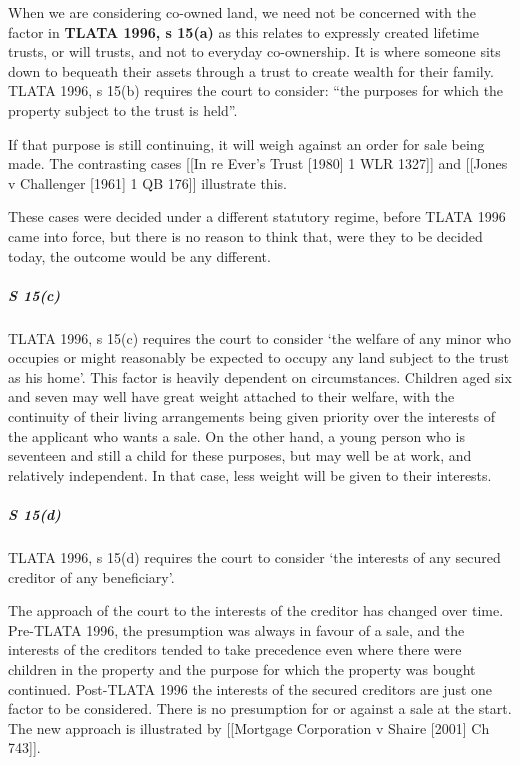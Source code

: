 \documentclass[
]{article}
\newenvironment{Shaded}{}{}
\newcommand{\NormalTok}[1]{#1}
\begin{document}
When we are considering co-owned land, we need not be concerned with the
factor in \textbf{TLATA 1996, s 15(a)} as this relates to expressly
created lifetime trusts, or will trusts, and not to everyday
co-ownership. It is where someone sits down to bequeath their assets
through a trust to create wealth for their family. TLATA 1996, s 15(b)
requires the court to consider: ``the purposes for which the property
subject to the trust is held''.

If that purpose is still continuing, it will weigh against an order for
sale being made. The contrasting cases {[}{[}In re Ever's Trust
{[}1980{]} 1 WLR 1327{]}{]} and {[}{[}Jones v Challenger {[}1961{]} 1 QB
176{]}{]} illustrate this.

\begin{Shaded}
\begin{Highlighting}[]
\NormalTok{These cases were decided under a different statutory regime, before TLATA 1996 came into force, but there is no reason to think that, were they to be decided today, the outcome would be any different.}
\end{Highlighting}
\end{Shaded}

\hypertarget{s-15c}{%
\subparagraph{S 15(c)}\label{s-15c}}

TLATA 1996, s 15(c) requires the court to consider `the welfare of any
minor who occupies or might reasonably be expected to occupy any land
subject to the trust as his home'. This factor is heavily dependent on
circumstances. Children aged six and seven may well have great weight
attached to their welfare, with the continuity of their living
arrangements being given priority over the interests of the applicant
who wants a sale. On the other hand, a young person who is seventeen and
still a child for these purposes, but may well be at work, and
relatively independent. In that case, less weight will be given to their
interests.

\hypertarget{s-15d}{%
\subparagraph{S 15(d)}\label{s-15d}}

TLATA 1996, s 15(d) requires the court to consider `the interests of any
secured creditor of any beneficiary'.

The approach of the court to the interests of the creditor has changed
over time. Pre-TLATA 1996, the presumption was always in favour of a
sale, and the interests of the creditors tended to take precedence even
where there were children in the property and the purpose for which the
property was bought continued. Post-TLATA 1996 the interests of the
secured creditors are just one factor to be considered. There is no
presumption for or against a sale at the start. The new approach is
illustrated by {[}{[}Mortgage Corporation v Shaire {[}2001{]} Ch
743{]}{]}.
\end{document}
